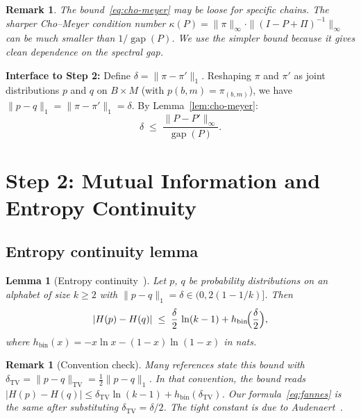 \documentclass[11pt]{article}
\newtheorem{lemma}[theorem]{Lemma}
\newtheorem{remark}[theorem]{Remark}
\DeclareMathOperator{\gap}{gap}
\begin{document}
\begin{remark}
The bound~\eqref{eq:cho-meyer} may be loose for specific chains.
The sharper Cho--Meyer condition number
$\kappa(P) = \|\pi\|_\infty \cdot \|(I - P + \Pi)^{-1}\|_\infty$
can be much smaller than $1/\gap(P)$.  We use the simpler bound because
it gives clean dependence on the spectral gap.
\end{remark}

\textbf{Interface to Step 2:}
Define $\delta = \|\pi - \pi'\|_1$.  Reshaping $\pi$ and $\pi'$ as
joint distributions $p$ and $q$ on $B \times M$ (with
$p(b,m) = \pi_{(b,m)}$), we have $\|p - q\|_1 = \|\pi - \pi'\|_1 = \delta$.
By Lemma~\ref{lem:cho-meyer}:
\begin{equation}\label{eq:delta-bound}
  \delta \;\le\; \frac{\|P - P'\|_\infty}{\gap(P)}.
\end{equation}

\section{Step 2: Mutual Information and Entropy Continuity}

\subsection{Entropy continuity lemma}

\begin{lemma}[Entropy continuity~\cite{CsiszarKorner2011,Audenaert2007}]
\label{lem:entropy-cont}
Let $p$, $q$ be probability distributions on an alphabet of size $k \ge 2$
with $\|p - q\|_1 = \delta \in (0, 2(1 - 1/k)]$.  Then
\begin{equation}\label{eq:fannes}
  |H(p) - H(q)| \;\le\; \frac{\delta}{2}\,\ln(k-1)
  + h_{\mathrm{bin}}\!\Bigl(\frac{\delta}{2}\Bigr),
\end{equation}
where $h_{\mathrm{bin}}(x) = -x\ln x - (1-x)\ln(1-x)$ in nats.
\end{lemma}

\begin{remark}[Convention check]\label{rem:convention}
Many references state this bound with $\delta_{\mathrm{TV}} = \|p-q\|_{\mathrm{TV}}
= \frac{1}{2}\|p-q\|_1$.  In that convention, the bound reads
$|H(p) - H(q)| \le \delta_{\mathrm{TV}}\ln(k-1) + h_{\mathrm{bin}}(\delta_{\mathrm{TV}})$.
Our formula~\eqref{eq:fannes} is the same after substituting
$\delta_{\mathrm{TV}} = \delta/2$.
The tight constant is due to Audenaert~\cite{Audenaert2007}.
\end{remark}
\end{document}
